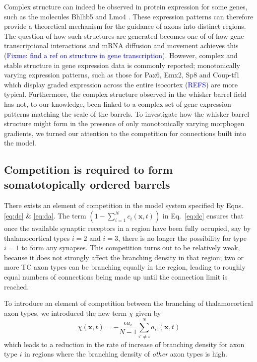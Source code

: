 \documentclass[a4paper,11pt]{article}
\newcommand{\cmnt}[1]{\textcolor{blue}{#1}}
\newcommand{\e}{\emph}
\newcommand{\mb}[1]{\mathbf{#1}}
\begin{document}
Complex structure can indeed be observed in protein expression for some genes,
such as the molecules Bhlhb5 \citep{Joshi2008} and Lmo4
\citep{Cederquist2013,greig_molecular_2013}. These expression patterns can therefore
provide a theoretical mechanism for the guidance of axons into distinct
regions. The question of how such structures are generated becomes one of of
how gene transcriptional interactions and mRNA diffusion and movement achieves
this (\cmnt{Fixme: find a ref on structure in gene transcription}). However,
complex and stable structure in gene expression data is commonly reported;
monotonically varying expression patterns, such as those for Pax6, Emx2, Sp8
and Coup-tf1 which display graded expression across the entire isocortex
(\cmnt{REFS}) are more typical. Furthermore, the complex structure observed in
the whisker barrel field has not, to our knowledge, been linked to a complex
set of gene expression patterns matching the scale of the barrels. To
investigate how the whisker barrel structure might form in the presence of
only monotonically varying morphogen gradients, we turned our attention to the
competition for connections built into the model.


\subsection*{Competition is required to form somatotopically ordered barrels}

There exists an element of competition in the model system specified by
Eqns. \ref{eq:dc} \& \ref{eq:da}. The term $\left(1 -
\sum_{i=1}^{N} c_i(\mb{x}, t)\right)$ in Eq.~\ref{eq:dc} ensures that once the available synaptic
receptors in a region have been fully occupied, say by thalamocortical types
$i=2$ and $i=3$, there is no longer the possibility for type $i=1$ to form any
synapses. This competition turns out to be relatively weak, because it does
not strongly affect the branching density in that region; two or more TC axon
types can be branching equally in the region, leading to roughly equal numbers
of connections being made up until the connection limit is reached.

To introduce an element of competition between the branching of
thalamocortical axon types, we introduced the new term $\chi$ given by
%
\begin{equation} \label{eq:branch_comp}
\chi(\mb{x}, t) = - \frac{\epsilon  a_i}{N-1} \sum_{i' \ne i}^{N} a_{i'}(\mb{x}, t)
\end{equation}
%
which leads to a reduction in the rate of increase of branching density for
axon type $i$ in regions where the branching density of \e{other} axon
types is high.
\end{document}
